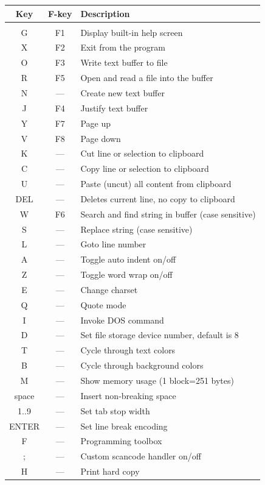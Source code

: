 \documentclass{article}
\begin{document}
    \begin{longtable}[l]{c c l}
        \textbf{Key} & \textbf{F-key} & \textbf{Description} \\
        \hline \\
        G    & F1    & Display built-in help screen \\
        X    & F2    & Exit from the program \\
        O    & F3    & Write text buffer to file \\
        R    & F5    & Open and read a file into the buffer \\
        N    & ---   & Create new text buffer \\
        J    & F4    & Justify text buffer \\
        Y    & F7    & Page up \\
        V    & F8    & Page down \\
        K    & ---   & Cut line or selection to clipboard \\
        C    & ---   & Copy line or selection to clipboard \\
        U    & ---   & Paste (uncut) all content from clipboard \\
        DEL  & ---   & Deletes current line, no copy to clipboard \\
        W    & F6    & Search and find string in buffer (case sensitive) \\
        S    & ---   & Replace string (case sensitive) \\
        L    & ---   & Goto line number \\
        A    & ---   & Toggle auto indent on/off \\
        Z    & ---   & Toggle word wrap on/off \\
        E    & ---   & Change charset \\
        Q    & ---   & Quote mode \\
        I    & ---   & Invoke DOS command \\
        D    & ---   & Set file storage device number, default is 8 \\
        T    &  ---  & Cycle through text colors \\
        B    &  ---  & Cycle through background colors \\
        M    &  ---  & Show memory usage (1 block=251 bytes) \\
        space& ---   & Insert non-breaking space \\
        1..9 & ---   & Set tab stop width \\
        ENTER & ---  & Set line break encoding \\
        F    & ---   & Programming toolbox \\
        ;    & ---   & Custom scancode handler on/off \\
        H    & ---   & Print hard copy \\
    \end{longtable}
\end{document}
